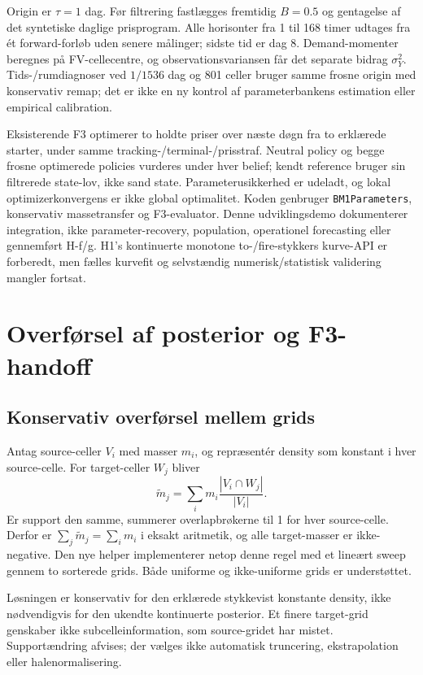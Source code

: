 Origin er $\tau=1$ dag. Før filtrering fastlægges fremtidig $B=0.5$ og gentagelse
af det syntetiske daglige prisprogram. Alle horisonter fra 1 til 168 timer
udtages fra ét forward-forløb uden senere målinger; sidste tid er dag 8.
Demand-momenter beregnes på FV-cellecentre, og observationsvariansen får
det separate bidrag $\sigma_Y^2$. Tids-/rumdiagnoser ved $1/1536$ dag og
801 celler bruger samme frosne origin med konservativ remap; det er ikke
en ny kontrol af parameterbankens estimation eller empirical calibration.

Eksisterende F3 optimerer to holdte priser over næste døgn fra to erklærede
starter, under samme tracking-/terminal-/prisstraf. Neutral policy og begge
frosne optimerede policies vurderes under hver belief; kendt reference bruger
sin filtrerede state-lov, ikke sand state. Parameterusikkerhed er udeladt,
og lokal optimizerkonvergens er ikke global optimalitet. Koden genbruger
\texttt{BM1Parameters}, konservativ massetransfer og F3-evaluator. Denne
udviklingsdemo dokumenterer integration, ikke parameter-recovery, population,
operationel forecasting eller gennemført H-f/g. H1's kontinuerte monotone
to-/fire-stykkers kurve-API er forberedt, men fælles kurvefit og selvstændig
numerisk/statistisk validering mangler fortsat.

\section{Overførsel af posterior og F3-handoff}
\subsection{Konservativ overførsel mellem grids}
Antag source-celler \(V_i\) med masser \(m_i\), og repræsentér density som konstant i hver source-celle. For target-celler \(W_j\) bliver
\begin{equation}
 \widetilde m_j=\sum_i m_i\frac{|V_i\cap W_j|}{|V_i|}.
 \label{eq:remap}
\end{equation}
Er support den samme, summerer overlapbrøkerne til 1 for hver source-celle. Derfor er \(\sum_j\widetilde m_j=\sum_i m_i\) i eksakt aritmetik, og alle target-masser er ikke-negative. Den nye helper implementerer netop denne regel med et lineært sweep gennem to sorterede grids. Både uniforme og ikke-uniforme grids er understøttet.

Løsningen er konservativ for den erklærede stykkevist konstante density, ikke nødvendigvis for den ukendte kontinuerte posterior. Et finere target-grid genskaber ikke subcelleinformation, som source-gridet har mistet. Supportændring afvises; der vælges ikke automatisk truncering, ekstrapolation eller halenormalisering.

